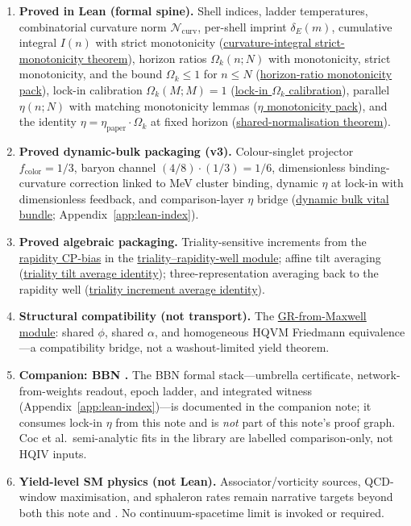 \documentclass[11pt]{amsart}
\newcommand{\LeanEng}[2]{\hyperref[#1]{#2}}
\begin{document}
\begin{enumerate}[leftmargin=2em]
\item \textbf{Proved in Lean (formal spine).} Shell indices, ladder
  temperatures, combinatorial curvature norm $\mathcal{N}_{\mathrm{curv}}$,
  per-shell imprint $\delta_E(m)$, cumulative integral $I(n)$ with strict
  monotonicity (\LeanEng{lean:curvature-integral-mono}{curvature-integral
  strict-monotonicity theorem}), horizon ratios $\Omega_k(n;N)$ with
  monotonicity, strict monotonicity, and the bound $\Omega_k\le 1$ for
  $n\le N$ (\LeanEng{lean:omega-k-mono}{horizon-ratio monotonicity
  pack}), lock-in calibration $\Omega_k(M;M)=1$
  (\LeanEng{lean:omega-k-lockin}{lock-in $\Omega_k$ calibration}), parallel
  $\eta(n;N)$ with matching monotonicity lemmas
  (\LeanEng{lean:eta-mono}{$\eta$ monotonicity pack}), and the identity
  $\eta=\eta_{\mathrm{paper}}\cdot\Omega_k$ at fixed horizon
  (\LeanEng{lean:eta-omega-same}{shared-normalisation theorem}).
\item \textbf{Proved dynamic-bulk packaging (v3).}
  Colour-singlet projector $f_{\mathrm{color}}=1/3$, baryon channel
  $(4/8)\cdot(1/3)=1/6$, dimensionless binding-curvature correction linked
  to MeV cluster binding, dynamic $\eta$ at lock-in with dimensionless
  feedback, and comparison-layer $\eta$ bridge
  (\LeanEng{lean:dynamic-bulk-vital}{dynamic bulk vital bundle};
  Appendix~\ref{app:lean-index}).
\item \textbf{Proved algebraic packaging.} Triality-sensitive increments
  from the \LeanEng{lean:rapidity-cp-bias}{rapidity CP-bias} in the
  \LeanEng{lean:triality-well}{triality--rapidity-well module}; affine
  tilt averaging (\LeanEng{lean:triality-tilt-avg}{triality tilt
  average identity}); three-representation averaging back to the rapidity
  well (\LeanEng{lean:triality-inc-avg}{triality increment average
  identity}).
\item \textbf{Structural compatibility (not transport).} The
  \LeanEng{lean:gr-from-maxwell}{GR-from-Maxwell module}: shared
  $\phi$, shared $\alpha$, and homogeneous HQVM Friedmann equivalence---a
  compatibility bridge, not a washout-limited yield theorem.
\item \textbf{Companion: BBN \cite{hqiv-bbn-paper}.}
  The BBN formal stack---umbrella certificate, network-from-weights readout,
  epoch ladder, and integrated witness (Appendix~\ref{app:lean-index})---is
  documented in the companion note; it consumes lock-in $\eta$ from this note
  and is \emph{not} part of this note's proof graph. Coc et al.\ semi-analytic
  fits in the library are labelled comparison-only, not HQIV inputs.
\item \textbf{Yield-level SM physics (not Lean).} Associator/vorticity
  sources, QCD-window maximisation, and sphaleron rates remain narrative
  targets beyond both this note and \cite{hqiv-bbn-paper}. No
  continuum-spacetime limit is invoked or required.
\end{enumerate}
\end{document}
